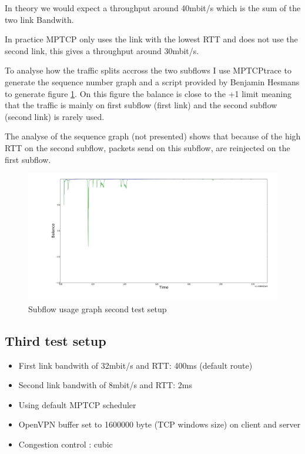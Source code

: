 In theory we would expect a throughput around 40mbit/s which is the sum of the two link Bandwith.

In practice MPTCP only uses the link with the lowest RTT and does not use the second link, this gives a throughput around 30mbit/s.

To analyse how the traffic splits accross the two subflows I use MPTCPtrace to generate the sequence number graph and a script provided by Benjamin Hesmans to generate figure \ref{32_8-2_400rtt_seq}.
On this figure the balance is close to the +1 limit meaning that the traffic is mainly on first subflow (first link) and the second subflow (second link) is rarely used.

The analyse of the sequence graph (not presented) shows that because of the high RTT on the second subflow, packets send on this subflow, are reinjected on the first subflow.

\begin{figure}[h!]
 \centering
 \includegraphics[width=14cm]{../results/32_8-2_400rtt_seq2.pdf}
 \caption{Subflow usage graph second test setup}
 \label{32_8-2_400rtt_seq}
\end{figure}

\subsection{Third test setup} \label{sec:third_test}

\begin{itemize}
\item First link bandwith of 32mbit/s and RTT: 400ms (default route)
\item Second link bandwith of 8mbit/s and RTT: 2ms
\item Using default MPTCP scheduler
\item OpenVPN buffer set to 1600000 byte (TCP windows size) on client and server
\item Congestion control : cubic
\end{itemize}

